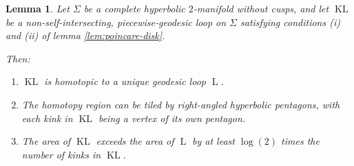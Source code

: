 \documentclass[a4paper,11pt]{article}
\newcommand{\KL}{\operatorname{KL}}
\renewcommand{\L}{\operatorname{L}}
\newtheorem{lemma}[theorem]{Lemma}
\begin{document}
\begin{lemma}
    \label{lem:homotopy-shrinking-loop}
    Let $\Sigma$ be a complete hyperbolic $2$-manifold without cusps, and let $\KL$ be a non-self-intersecting, piecewise-geodesic loop on $\Sigma$ satisfying conditions (i) and (ii) of lemma \ref{lem:poincare-disk}.
    
    Then:
    \begin{enumerate}[(1)]
        \item $\KL$ is homotopic to a unique geodesic loop $\L$.
        \item The homotopy region can be tiled by right-angled hyperbolic pentagons, with each kink in $\KL$ being a vertex of its own pentagon.
        \item The area of $\KL$ exceeds the area of $\L$ by at least $\log(2)$ times the number of kinks in $\KL$.
    \end{enumerate}
\end{lemma}
\end{document}
